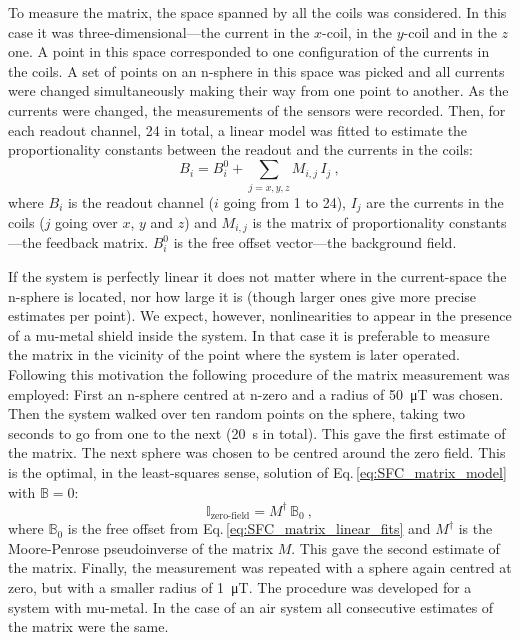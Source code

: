 To measure the matrix, the space spanned by all the coils was considered. In this case it was three-dimensional---the current in the $x$-coil, in the $y$-coil and in the $z$ one. A point in this space corresponded to one configuration of the currents in the coils. A set of points on an n-sphere in this space was picked and all currents were changed simultaneously making their way from one point to another. As the currents were changed, the measurements of the sensors were recorded. Then, for each readout channel, 24 in total, a linear model was fitted to estimate the proportionality constants between the readout and the currents in the coils:
\begin{equation}
  \label{eq:SFC_matrix_linear_fits}
  B_i = B_i^0 + \sum_{j=x,y,z} M_{i,j} \, I_j \ ,
\end{equation}
where $B_i$ is the readout channel ($i$ going from 1 to 24), $I_j$ are the currents in the coils ($j$ going over $x$, $y$ and $z$) and $M_{i,j}$ is the matrix of proportionality constants---the feedback matrix. $B_i^0$ is the free offset vector---the background field.

If the system is perfectly linear it does not matter where in the current-space the n-sphere is located, nor how large it is (though larger ones give more precise estimates per point). We expect, however, nonlinearities to appear in the presence of a mu-metal shield inside the system.
In that case it is preferable to measure the matrix in the vicinity of the point where the system is later operated. Following this motivation the following procedure of the matrix measurement was employed: First an n-sphere centred at n-zero and a radius of \SI{50}{\micro\tesla} was chosen. Then the system walked over ten random points on the sphere, taking two seconds to go from one to the next (\SI{20}{\second} in total).
This gave the first estimate of the matrix. The next sphere was chosen to be centred around the zero field. This is the optimal, in the least-squares sense, solution of Eq.\,\ref{eq:SFC_matrix_model} with $\mathbb{B} = 0$:
\begin{equation}
  \label{eq:SFC_zero_field_requirement}
  \mathbb{I}_\text{zero-field} = M^\dagger \, \mathbb{B}_0 \ ,
\end{equation}
where $\mathbb{B}_0$ is the free offset from Eq.\,\ref{eq:SFC_matrix_linear_fits} and $M^\dagger$ is the Moore-Penrose pseudoinverse of the matrix $M$. This gave the second estimate of the matrix. Finally, the measurement was repeated with a sphere again centred at zero, but with a smaller radius of \SI{1}{\micro\tesla}. The procedure was developed for a system with mu-metal. In the case of an air system all consecutive estimates of the matrix were the same.

